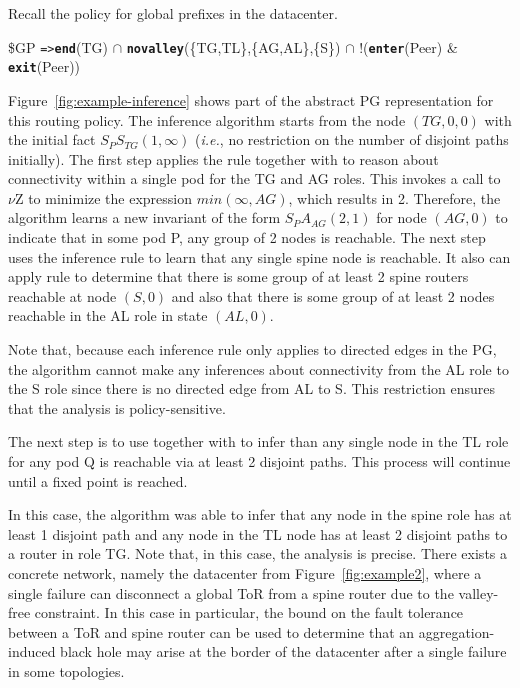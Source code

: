 \documentclass[numbers, 10pt, preprint]{sigplanconf}
\newcommand{\IE}{\emph{i.e.}}
\newcommand{\KW}[1]{\texttt{\small\bfseries{#1}}}
\newcommand{\Path}{\texttt{=>}}
\newcommand{\Exit}{\KW{exit}}
\newcommand{\End}{\KW{end}}
\newcommand{\Enter}{\KW{enter}}
\newcommand{\Novalley}{\KW{novalley}}
\begin{document}
Recall the policy for global prefixes in the datacenter.
%
\begin{code}
\$GP \Path \End(TG) \ensuremath{\cap}
       \Novalley(\{TG,TL\},\{AG,AL\},\{S\}) \ensuremath{\cap}
       !(\Enter(Peer) & \Exit(Peer))
\end{code}
\noindent
%
Figure~\ref{fig:example-inference} shows part of the abstract PG representation for this routing policy. The inference algorithm starts from the node $(TG,0,0)$ with the initial fact $S_P S_{TG}(1,\infty)$ (\IE, no restriction on the number of disjoint paths initially).
%
The first step applies the rule  together with  to reason about connectivity within a single pod for the TG and AG roles. This invokes a call to $\nu$Z to minimize the expression $min(\infty, AG)$, which results in 2. Therefore, the algorithm learns a new invariant of the form $S_P A_{AG} (2,1)$ for node $(AG, 0)$ to indicate that in some pod P, any group of 2 nodes is reachable.
%
The next step uses the inference rule  to learn that any single spine node is reachable. It also can apply rule  to determine that there is some group of at least 2 spine routers reachable at node $(S,0)$ and also that there is some group of at least 2 nodes reachable in the AL role in state $(AL,0)$.

Note that, because each inference rule only applies to directed edges in the PG, the algorithm cannot make any inferences about connectivity from the AL role to the S role since there is no directed edge from AL to S. This restriction ensures that the analysis is policy-sensitive.

The next step is to use  together with  to infer than any single node in the TL role for any pod Q is reachable via at least 2 disjoint paths. This process will continue until a fixed point is reached.

In this case, the algorithm was able to infer that any node in the spine role has at least 1 disjoint path and any node in the TL node has at least 2 disjoint paths to a router in role TG. Note that, in this case, the analysis is precise. There exists a concrete network, namely the datacenter from Figure~\ref{fig:example2}, where a single failure can disconnect a global ToR from a spine router due to the valley-free constraint. In this case in particular, the bound on the fault tolerance between a ToR and spine router can be used to determine that an aggregation-induced black hole may arise at the border of the datacenter after a single failure in some topologies.
\end{document}

